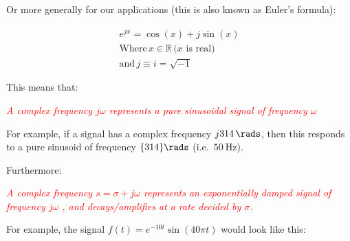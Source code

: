 \documentclass[
  12pt,
  a4paper,
]{report}
\begin{document}
Or more generally for our applications (this is also known as Euler's
formula):

\begin{gather}
    \label{eq:de-moivre-formula-general}
    e^{jx} = \cos(x) + j \sin(x) \\
    \text{Where} \, x \in \mathbb{R}\, \text{(\(x\) is real)} \\
    \text{and} \, j \equiv i = \sqrt{-1}
\end{gather}

This means that:\\
\begin{tcolorbox}[colback=boxbodycol,colframe=boxheadcol]
    \begin{center}
        \textcolor{red}{\emph{A complex frequency \(j\omega \) represents a pure sinusoidal signal of frequency \(\omega \) \unit{\rads}}}
    \end{center}
\end{tcolorbox}

For example, if a signal has a complex frequency
\(\complexqty[output-complex-root=j, complex-root-position=before-number]{314i}{\rads}\),
then this responds to a pure sinusoid of frequency \(\qty{314}{\rads}\)
(i.e.~\(\qty{50}{\hertz}\)).

Furthermore:\\
\begin{tcolorbox}[colback=boxbodycol,colframe=boxheadcol]
    \begin{center}
        \textcolor{red}{\emph{A complex frequency \(s = \sigma + j\omega\) represents an exponentially damped signal of frequency \(j\omega\) \unit{\rads}, and decays/amplifies at a rate decided by \(\sigma\).}}
    \end{center}
\end{tcolorbox}

For example, the signal \(f(t) =  e^{-10t} \sin(40\pi t)\) would look
like this:
\end{document}
